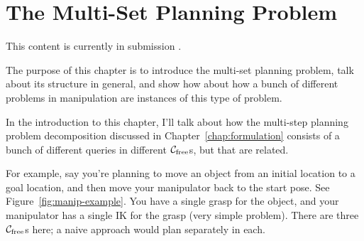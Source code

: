 \chapter{The Multi-Set Planning Problem}
\label{chap:multi-set}

This content is currently in submission \cite{dellin2015multiset}.

The purpose of this chapter is to introduce the multi-set planning
problem,
talk about its structure in general,
and show how about how a bunch of different problems in manipulation
are instances of this type of problem.

In the introduction to this chapter,
I'll talk about how the multi-step planning problem decomposition
discussed in Chapter~\ref{chap:formulation}
consists of a bunch of different queries in different
$\mathcal{C}_{\mbox{\scriptsize free}}$s, but that are related.

For example, say you're planning to move an object from an initial
location to a goal location,
and then move your manipulator back to the start pose.
See Figure~\ref{fig:manip-example}.
You have a single grasp for the object,
and your manipulator has a single IK for the grasp (very simple problem).
There are three $\mathcal{C}_{\mbox{\scriptsize free}}$s here;
a naive approach would plan separately in each.

